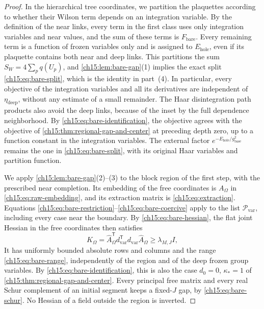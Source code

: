 \begin{proof}
In the hierarchical tree coordinates, we partition the plaquettes according to whether their Wilson term depends on an integration variable. By the definition of the near links, every term in the first class uses only integration variables and near values, and the sum of these terms is $F_{\mathrm{bare}}$. Every remaining term is a function of frozen variables only and is assigned to $E_{\mathrm{hole}}$, even if its plaquette contains both near and deep links. This partitions the sum $S_W=4\sum_pq(U_p)$, and \cref{ch15:lem:bare-gap}(1) implies the exact split \eqref{ch15:eq:bare-split}, which is the identity in part~(4). In particular, every objective of the integration variables and all its derivatives are independent of $\eta_{\mathrm{deep}}$, without any estimate of a small remainder. The Haar disintegration path products also avoid the deep links, because of the inset by the full dependence neighborhood. By \eqref{ch15:eq:bare-identification}, the objective agrees with the objective of \cref{ch15:thm:regional-gap-and-center} at preceding depth zero, up to a function constant in the integration variables. The external factor $e^{-E_{\mathrm{hole}}/g_{\mathrm{base}}^2}$ remains the one in \eqref{ch15:eq:bare-split}, with its original Haar variables and partition function.

We apply \cref{ch15:lem:bare-gap}(2)--(3) to the block region of the first step, with the prescribed near completion. Its embedding of the free coordinates is $A_\Omega$ in \eqref{ch15:eq:raw-embedding}, and its extraction matrix is \eqref{ch15:eq:extraction}. Equations \eqref{ch15:eq:bare-restriction}--\eqref{ch15:eq:bare-coercive} apply to the list $\mathcal P_{\mathrm{var}}$, including every case near the boundary. By \eqref{ch15:eq:bare-hessian}, the flat joint Hessian in the free coordinates then satisfies
\[
 K_\Omega=\widehat A_\Omega^{\mathsf T}d_{\mathrm{var}}^{\mathsf T}
                               d_{\mathrm{var}}\widehat A_\Omega
       \ge\lambda_{M,J}I,
\]
It has uniformly bounded absolute rows and columns and the range \eqref{ch15:eq:bare-range}, independently of the region and of the deep frozen group variables. By \eqref{ch15:eq:bare-identification}, this is also the case $d_0=0$, $\kappa_*=1$ of \cref{ch15:thm:regional-gap-and-center}. Every principal free matrix and every real Schur complement of an initial segment keeps a fixed-$J$ gap, by \eqref{ch15:eq:bare-schur}. No Hessian of a field outside the region is inverted.


\end{proof}
